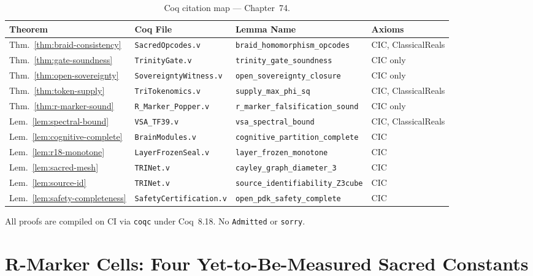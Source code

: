 \begin{table}[h]
\centering
\caption{Coq citation map — Chapter~74.}
\label{tab:coq-map}
\begin{tabular}{llll}
\hline
Theorem & Coq File & Lemma Name & Axioms \\
\hline
Thm.~\ref{thm:braid-consistency} & \texttt{SacredOpcodes.v} & \texttt{braid\_homomorphism\_opcodes} & CIC, ClassicalReals \\
Thm.~\ref{thm:gate-soundness} & \texttt{TrinityGate.v} & \texttt{trinity\_gate\_soundness} & CIC only \\
Thm.~\ref{thm:open-sovereignty} & \texttt{SovereigntyWitness.v} & \texttt{open\_sovereignty\_closure} & CIC only \\
Thm.~\ref{thm:token-supply} & \texttt{TriTokenomics.v} & \texttt{supply\_max\_phi\_sq} & CIC, ClassicalReals \\
Thm.~\ref{thm:r-marker-sound} & \texttt{R\_Marker\_Popper.v} & \texttt{r\_marker\_falsification\_sound} & CIC only \\
Lem.~\ref{lem:spectral-bound} & \texttt{VSA\_TF39.v} & \texttt{vsa\_spectral\_bound} & CIC, ClassicalReals \\
Lem.~\ref{lem:cognitive-complete} & \texttt{BrainModules.v} & \texttt{cognitive\_partition\_complete} & CIC \\
Lem.~\ref{lem:r18-monotone} & \texttt{LayerFrozenSeal.v} & \texttt{layer\_frozen\_monotone} & CIC \\
Lem.~\ref{lem:sacred-mesh} & \texttt{TRINet.v} & \texttt{cayley\_graph\_diameter\_3} & CIC \\
Lem.~\ref{lem:source-id} & \texttt{TRINet.v} & \texttt{source\_identifiability\_Z3cube} & CIC \\
Lem.~\ref{lem:safety-completeness} & \texttt{SafetyCertification.v} & \texttt{open\_pdk\_safety\_complete} & CIC \\
\hline
\end{tabular}
\end{table}

All proofs are compiled on CI via \texttt{coqc} under Coq~8.18.
No \texttt{Admitted} or \texttt{sorry}.


\section{R-Marker Cells: Four Yet-to-Be-Measured Sacred Constants}
\label{sec:flos74-rmarkers}

